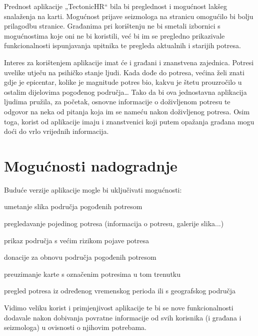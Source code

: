 {Prednost aplikacije „TectonicHR“ bila bi preglednost i mogućnost lakšeg snalaženja na karti. 
Mogućnost prijave seizmologa na stranicu omogućilo bi bolju prilagodbu stranice. Građanima pri korištenju ne bi smetali izbornici s mogućnostima koje oni ne bi koristili, već bi im se pregledno prikazivale funkcionalnosti ispunjavanja upitnika te pregleda aktualnih i starijih potresa. }

{Interes za korištenjem aplikacije imat će i građani i znanstvena zajednica. Potresi uvelike utječu na psihičko stanje ljudi. 
Kada dođe do potresa, većina želi znati gdje je epicentar, kolike je magnitude potres bio, kakvu je štetu prouzročilo u ostalim dijelovima pogođenog područja… 
Tako da bi ova jednostavna aplikacija ljudima pružila, za početak, osnovne informacije o doživljenom potresu te odgovor na neka od pitanja koja im se nameću nakon doživljenog potresa. 
Osim toga, korist od aplikacije imaju i znanstvenici koji putem opažanja građana mogu doći do vrlo vrijednih informacija. }\\		

\section{Mogućnosti nadogradnje}
{Buduće verzije aplikacije mogle bi uključivati mogućnosti:
\begin{packed_enum}
	\item umetanje slika područja pogođenih potresom
	\item pregledavanje pojedinog potresa (informacija o potresu, galerije slika...)
	\item prikaz područja s većim rizikom pojave potresa
	\item donacije za obnovu područja pogođenih potresom
	\item preuzimanje karte s označenim potresima u tom trenutku
	\item pregled potresa iz određenog vremenskog perioda ili s geografskog područja
\end{packed_enum}
Vidimo veliku korist i primjenjivost aplikacije te bi se nove funkcionalnosti dodavale nakon dobivanja povratne informacije od svih korisnika (i građana i seizmologa) u ovisnosti o njihovim potrebama.
}

	
\eject
	
	